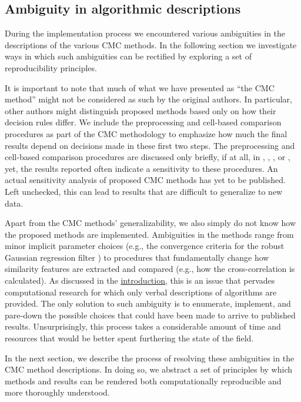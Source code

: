 \hypertarget{ambiguities}{%
\subsection{Ambiguity in algorithmic descriptions}\label{ambiguities}}

During the implementation process we encountered various ambiguities in
the descriptions of the various CMC methods. In the following section we
investigate ways in which such ambiguities can be rectified by exploring
a set of reproducibility principles.

It is important to note that much of what we have presented as ``the CMC
method'' might not be considered as such by the original authors. In
particular, other authors might distinguish proposed methods based only
on how their decision rules differ. We include the preprocessing and
cell-based comparison procedures as part of the CMC methodology to
emphasize how much the final results depend on decisions made in these
first two steps. The preprocessing and cell-based comparison procedures
are discussed only briefly, if at all, in \citet{song_3d_2014},
\citet{tong_fired_2014}, \citet{tong_improved_2015}, or
\citet{chen_convergence_2017}, yet, the results reported often indicate
a sensitivity to these procedures. An actual sensitivity analysis of
proposed CMC methods has yet to be published. Left unchecked, this can
lead to results that are difficult to generalize to new data.

Apart from the CMC methods' generalizability, we also simply do not know
how the proposed methods are implemented. Ambiguities in the methods
range from minor implicit parameter choices (e.g., the convergence
criteria for the robust Gaussian regression filter
\citep{brinkman_bodschwinna_2003}) to procedures that fundamentally
change how similarity features are extracted and compared (e.g., how the
cross-correlation is calculated). As discussed in the
\protect\hyperlink{intro}{introduction}, this is an issue that pervades
computational research for which only verbal descriptions of algorithms
are provided. The only solution to such ambiguity is to enumerate,
implement, and pare-down the possible choices that could have been made
to arrive to published results. Unsurprisingly, this process takes a
considerable amount of time and resources that would be better spent
furthering the state of the field.

In the next section, we describe the process of resolving these
ambiguities in the CMC method descriptions. In doing so, we abstract a
set of principles by which methods and results can be rendered both
computationally reproducible and more thoroughly understood.

